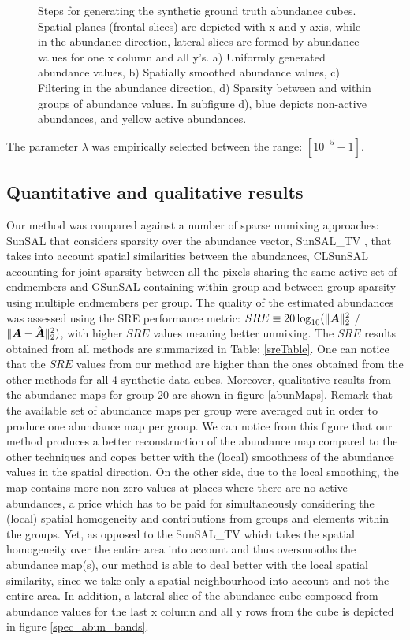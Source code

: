\documentclass{article}
\begin{document}
\begin{figure}[h!]
	\caption{Steps for generating the synthetic ground truth abundance cubes. Spatial planes (frontal slices) are depicted with x and y axis, while in the  abundance direction, lateral slices are formed by abundance values for one x column and all y's. a) Uniformly generated abundance values, b) Spatially smoothed abundance values, c) Filtering in the abundance direction, d) Sparsity between and within groups of abundance values. In subfigure d), blue depicts non-active abundances, and yellow active abundances. }\label{genA}
\end{figure}
The parameter $\lambda$ was empirically selected between the range: $[10^{-5} - 1]$.
 
\subsection{Quantitative and qualitative results}
Our method was compared against a number of sparse unmixing approaches: SunSAL \cite{spUnmix} that considers sparsity over the abundance vector, SunSAL\_TV \cite{totVar}, that takes into account  spatial similarities between the abundances, CLSunSAL \cite{iordache14} accounting for joint sparsity between all the pixels sharing the same active set of endmembers and GSunSAL \cite{spGroup_unmix} containing within group and between group sparsity using multiple endmembers per group. The quality of the estimated abundances was assessed using the SRE performance metric: $SRE \equiv 20\log_{10}(\|\mbox{\boldmath$A$} \|_2^2$ / $\|\mbox{\boldmath$A$} -\hat{\mbox{\boldmath$A$}} \|_2^2)$, with higher $SRE$ values meaning better unmixing. %
The $SRE$ results obtained from all methods are summarized in Table: \ref{sreTable}. One can notice that the $SRE$ values from our method are higher than the ones obtained from the other methods for all 4 synthetic data cubes. Moreover, qualitative results from the abundance maps for group 20 are shown in figure \ref{abunMaps}. Remark that the available set of abundance maps per group were averaged out in order to produce one abundance map per group. We can notice from this figure that our method produces a better reconstruction of the abundance map compared to the other techniques and copes better with the (local) smoothness of the abundance values in the spatial direction.  On the other side, due to the local smoothing, the map contains more non-zero values  at places where there are no active abundances, a price which has to be paid for simultaneously considering the (local) spatial homogeneity and  contributions from groups and elements within the groups. Yet, as opposed to the SunSAL\_TV which takes the spatial homogeneity over the entire area into account and thus oversmooths the abundance map(s), our method is able to deal better with the local spatial similarity, since we take only a spatial neighbourhood into account and not the entire area. In addition, a lateral slice of the abundance cube composed from abundance values for the last x column and all y rows from the cube is depicted in figure \ref{spec_abun_bands}. %
\end{document}
